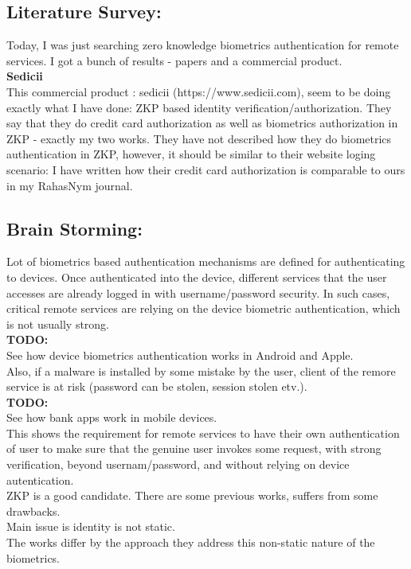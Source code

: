\documentclass[11pt]{article}
\begin{document}
\subsection*{Literature Survey:}
Today, I was just searching zero knowledge biometrics authentication for remote services. I got a bunch of results - papers and a commercial
product.\\
\textbf{Sedicii}\\
This commercial product : sedicii (https://www.sedicii.com), seem to be doing exactly what I have done: ZKP based identity verification/authorization.
They say that they do credit card authorization as well as biometrics authorization in ZKP - exactly my two works.
They have not described how they do biometrics authentication in ZKP, however, it should be similar to their website loging scenario:
I have written how their credit card authorization is comparable to ours in my RahasNym journal.

\subsection*{Brain Storming:}
Lot of biometrics based authentication mechanisms are defined for authenticating to devices. Once authenticated into the device, different services 
that the user accesses are already logged in with username/password security. In such cases, critical remote services are relying on the device 
biometric authentication, which is not usually strong.\\
\textbf{TODO:} \\ See how device biometrics authentication works in Android and Apple.\\
Also, if a malware is installed by some mistake by the user, client of the remore service is at risk (password can be stolen, session stolen etv.).\\ 
\textbf{TODO:}\\
See how bank apps work in mobile devices.\\

This shows the requirement for remote services to have their own authentication of user to make sure that the genuine user invokes some request, with 
strong verification, beyond usernam/password, and without relying on device autentication.\\
ZKP is a good candidate. There are some previous works, suffers from some drawbacks.\\ Main issue is identity is not static.\\
The works differ by the approach they address this non-static nature of the biometrics.\\
\end{document}
